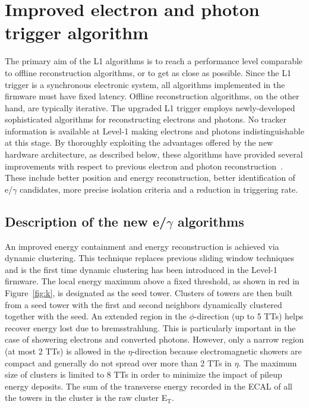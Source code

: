 \documentclass[a4paper,11pt]{article}
\begin{document}
\section{Improved electron and photon trigger algorithm}
The primary aim of the L1 algorithms is to reach a performance level comparable to offline reconstruction algorithms, or to get as close as possible.  Since the L1 trigger is a synchronous electronic system, all algorithms implemented in the firmware must have fixed latency. Offline reconstruction algorithms, on the other hand, are typically iterative. The upgraded L1 trigger employs newly-developed sophisticated algorithms for reconstructing electrons and photons. No tracker information is available at Level-1 making electrons and photons indistinguishable at this stage. By thoroughly exploiting the advantages offered by the new hardware architecture, as described below, these algorithms have provided several improvements with respect to previous electron and photon reconstruction~\cite{g}. These include better position and energy reconstruction, better identification of e/$\gamma$ candidates, more precise isolation criteria and a reduction in triggering rate. 

\subsection{Description of the new e/$\gamma$ algorithms} 
\label{subsec:algodescription}    
An improved energy containment and energy reconstruction is achieved via dynamic clustering. This technique replaces previous sliding window techniques and is the first time dynamic clustering has been introduced in the Level-1 firmware. The local energy maximum above a fixed threshold, as shown in red in Figure~\ref{fig:k}, is designated as the seed tower. Clusters of towers are then built from a seed tower with the first and second neighbors dynamically clustered together with the seed. An extended region in the $\phi$-direction (up to 5 TTs)  helps recover energy lost due to bremsstrahlung. This is particularly important in the case of showering electrons and converted photons. However, only a narrow region (at most 2 TTs) is allowed in the $\eta$-direction because electromagnetic showers are compact and generally do not spread over more than 2 TTs in $\eta$. The maximum size of clusters is  limited to 8 TTs in order to minimize the impact of pileup energy deposits. The sum of the transverse energy recorded in the ECAL of all the towers in the cluster is the raw cluster E$_\text{T}$. 
\end{document}
